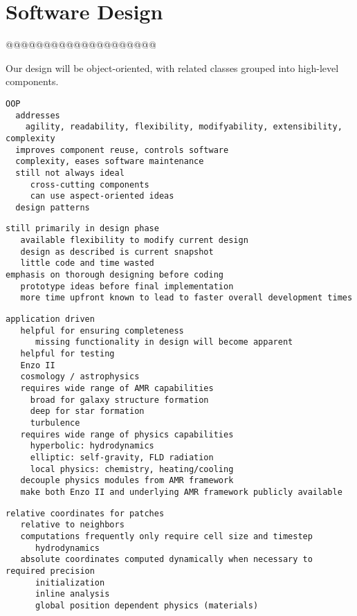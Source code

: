 \documentclass{article}
\begin{document}
\section{Software Design} \label{s:design}

@@@@@@@@@@@@@@@@@@@@

Our design will be object-oriented, with related classes grouped into
high-level components.


\begin{verbatim}
OOP
  addresses 
    agility, readability, flexibility, modifyability, extensibility, complexity
  improves component reuse, controls software
  complexity, eases software maintenance
  still not always ideal
     cross-cutting components
     can use aspect-oriented ideas
  design patterns
\end{verbatim}

\begin{verbatim}
still primarily in design phase
   available flexibility to modify current design
   design as described is current snapshot
   little code and time wasted
emphasis on thorough designing before coding
   prototype ideas before final implementation
   more time upfront known to lead to faster overall development times
\end{verbatim}

\begin{verbatim}
application driven
   helpful for ensuring completeness
      missing functionality in design will become apparent
   helpful for testing
   Enzo II
   cosmology / astrophysics
   requires wide range of AMR capabilities
     broad for galaxy structure formation
     deep for star formation
     turbulence
   requires wide range of physics capabilities
     hyperbolic: hydrodynamics
     elliptic: self-gravity, FLD radiation
     local physics: chemistry, heating/cooling
   decouple physics modules from AMR framework
   make both Enzo II and underlying AMR framework publicly available
\end{verbatim}

\begin{verbatim}
relative coordinates for patches   
   relative to neighbors
   computations frequently only require cell size and timestep
      hydrodynamics
   absolute coordinates computed dynamically when necessary to required precision
      initialization
      inline analysis
      global position dependent physics (materials)
\end{verbatim}
\end{document}
